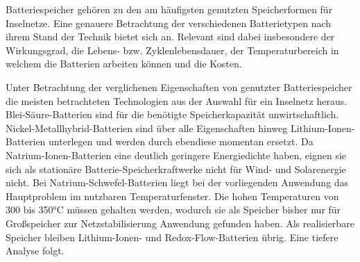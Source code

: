 Batteriespeicher gehören zu den am häufigsten genutzten Speicherformen für Inselnetze. 
Eine genauere Betrachtung der verschiedenen Batterietypen nach ihrem Stand der Technik bietet sich an. 
Relevant sind dabei insbesondere der Wirkungsgrad, die Lebens- bzw. Zyklenlebensdauer, 
der Temperaturbereich in welchem die Batterien arbeiten können und die Kosten.


Unter Betrachtung der verglichenen Eigenschaften von genutzter Batteriespeicher die meisten betrachteten Technologien 
aus der Auswahl für ein Inselnetz heraus. Blei-Säure-Batterien sind für die benötigte Speicherkapazität unwirtschaftlich. 
Nickel-Metallhybrid-Batterien sind über alle Eigenschaften hinweg Lithium-Ionen-Batterien unterlegen und werden durch ebendiese momentan ersetzt. 
Da Natrium-Ionen-Batterien eine deutlich geringere Energiedichte haben, eignen sie sich 
als stationäre Batterie-Speicherkraftwerke nicht für Wind- und Solarenergie nicht. 
Bei Natrium-Schwefel-Batterien liegt bei der vorliegenden Anwendung das Hauptproblem im nutzbaren Temperaturfenster. 
Die hohen Temperaturen von 300 bis 350°C müssen gehalten werden, wodurch sie als Speicher bisher nur 
für Großspeicher zur Netzstabilisierung Anwendung gefunden haben. 
Als realisierbare Speicher bleiben Lithium-Ionen- und Redox-Flow-Batterien übrig. 
Eine tiefere Analyse folgt.

